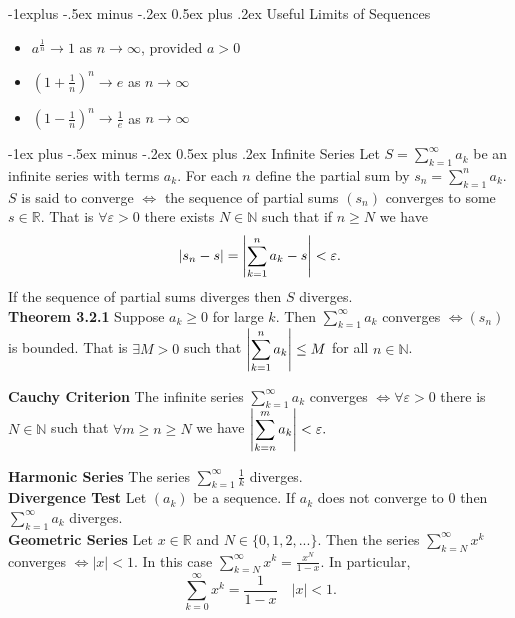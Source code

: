 \documentclass[10pt,landscape]{article}
\makeatletter
\DeclarePairedDelimiter\abs{\lvert}{\rvert}
\renewcommand{\section}{\@startsection{section}{1}{0mm}%
                                {-1ex plus -.5ex minus -.2ex}%
                                {0.5ex plus .2ex}%
                                {\normalfont\large\bfseries}}
\renewcommand{\subsection}{\@startsection{subsection}{2}{0mm}%
                                {-1explus -.5ex minus -.2ex}%
                                {0.5ex plus .2ex}%
                                {\normalfont\normalsize\bfseries}}
\makeatother
\begin{document}
\begin{multicols}{3}
	\subsection{Useful Limits of Sequences}
	\begin{itemize}
		\item $a^{\frac{1}{n}} \rightarrow 1$ as $ n \rightarrow \infty$, provided $a>0$
		\item $(1+\frac{1}{n})^n \rightarrow e$ as $ n \rightarrow \infty$
		\item $(1-\frac{1}{n})^n \rightarrow \frac{1}{e}$ as $ n \rightarrow \infty$
	\end{itemize}

\section{Infinite Series}
Let $S = \displaystyle \sum_{k=1}^{\infty} a_k$ be an infinite series with terms $a_k$. For each $n$ define the partial sum by $s_n = \displaystyle \sum_{k=1}^{n} a_k$. $S$ is said to converge $\iff$ the sequence of partial sums $(s_n)$ converges to some $s \in \mathbb{R}$. That is $\forall \varepsilon>0$ there exists $N \in \mathbb{N}$ such that if $n \geq N$ we have $$|s_n - s| = \abs*{\displaystyle \sum_{k=1}^{n} a_k - s} < \varepsilon. $$
If the sequence of partial sums diverges then $S$ diverges.\\

\textbf{Theorem 3.2.1} Suppose $a_k \geq 0$ for large $k$. Then $\displaystyle  \sum_{k=1}^{\infty}a_k $ converges $\iff (s_n)$ is bounded. That is $\exists M>0$ such that $\abs*{\displaystyle  \sum_{k=1}^{n}a_k} \leq M$ for all $n \in \mathbb{N}$.

\textbf{Cauchy Criterion} The infinite series $\sum_{k=1}^{\infty} a_k$ converges $\iff \forall \varepsilon >0$ there is $N \in \mathbb{N}$ such that $\forall m\geq n \geq N$ we have $ \abs*{\displaystyle \sum_{k=n}^{m} a_k} < \varepsilon.$

\textbf{Harmonic Series} The series $\displaystyle \sum_{k=1}^{\infty} \frac{1}{k} $ diverges.\\

\textbf{Divergence Test} Let $(a_k)$ be a sequence. If $a_k$ does not converge to 0 then $\displaystyle \sum_{k=1}^{\infty}a_k$ diverges.\\
\textbf{Geometric Series} Let $x \in \mathbb{R}$ and $N \in \{0,1,2,...\}.$ Then the series $\displaystyle  \sum_{k=N}^{\infty} x^k$ converges $\iff |x| < 1$. In this case $\displaystyle \sum_{k=N}^{\infty} x^k = \frac{x^N}{1-x}$. In particular, \vspace{-0.7\baselineskip} $$ \displaystyle \sum_{k=0}^{\infty} x^k = \frac{1}{1-x} \quad |x| < 1.$$


\end{multicols}
\end{document}
